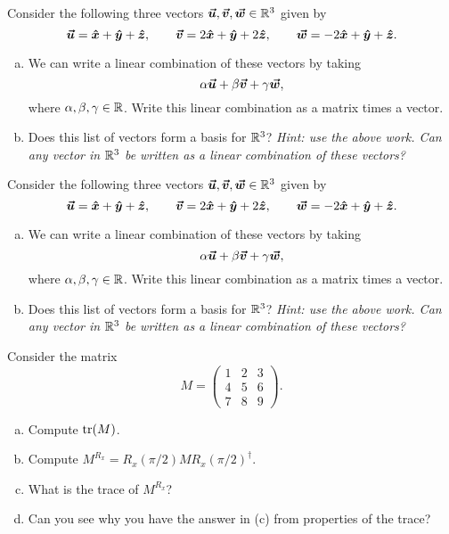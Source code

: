 \documentclass[12pt]{article} %
\begin{document}
\begin{problem}
Consider the following three vectors $\boldsymbol{\boldsymbol{\vec{u}}},\boldsymbol{\boldsymbol{\vec{v}}},\boldsymbol{\boldsymbol{\vec{w}}}\in \mathbb{R}^3$ given by
\[
\boldsymbol{\boldsymbol{\vec{u}}} = \boldsymbol{\hat{x}} + \boldsymbol{\hat{y}} +\boldsymbol{\hat{z}}, \qquad \boldsymbol{\boldsymbol{\vec{v}}} = 2\boldsymbol{\hat{x}} + \boldsymbol{\hat{y}} + 2\boldsymbol{\hat{z}}, \qquad \boldsymbol{\boldsymbol{\vec{w}}} = -2\boldsymbol{\hat{x}} + \boldsymbol{\hat{y}} +\boldsymbol{\hat{z}}. 
\]
\begin{enumerate}[(a)]
    \item We can write a linear combination of these vectors by taking
    \[
    \alpha \boldsymbol{\boldsymbol{\vec{u}}} + \beta \boldsymbol{\boldsymbol{\vec{v}}} + \gamma \boldsymbol{\boldsymbol{\vec{w}}},
    \]
    where $\alpha,\beta,\gamma \in \mathbb{R}$.  Write this linear combination as a matrix times a vector.
    \item Does this list of vectors form a basis for $\mathbb{R}^3$? \emph{Hint: use the above work. Can any vector in $\mathbb{R}^3$ be written as a linear combination of these vectors?}
\end{enumerate}
\end{problem}


\begin{problem}
Consider the following three vectors $\boldsymbol{\boldsymbol{\vec{u}}},\boldsymbol{\boldsymbol{\vec{v}}},\boldsymbol{\boldsymbol{\vec{w}}}\in \mathbb{R}^3$ given by
\[
\boldsymbol{\boldsymbol{\vec{u}}} = \boldsymbol{\hat{x}} + \boldsymbol{\hat{y}} +\boldsymbol{\hat{z}}, \qquad \boldsymbol{\boldsymbol{\vec{v}}} = 2\boldsymbol{\hat{x}} + \boldsymbol{\hat{y}} + 2\boldsymbol{\hat{z}}, \qquad \boldsymbol{\boldsymbol{\vec{w}}} = -2\boldsymbol{\hat{x}} + \boldsymbol{\hat{y}} +\boldsymbol{\hat{z}}. 
\]
\begin{enumerate}[(a)]
    \item We can write a linear combination of these vectors by taking
    \[
    \alpha \boldsymbol{\boldsymbol{\vec{u}}} + \beta \boldsymbol{\boldsymbol{\vec{v}}} + \gamma \boldsymbol{\boldsymbol{\vec{w}}},
    \]
    where $\alpha,\beta,\gamma \in \mathbb{R}$.  Write this linear combination as a matrix times a vector.
    \item Does this list of vectors form a basis for $\mathbb{R}^3$? \emph{Hint: use the above work. Can any vector in $\mathbb{R}^3$ be written as a linear combination of these vectors?}
\end{enumerate}
\end{problem}

\begin{problem}
Consider the matrix 
\[
M = \begin{pmatrix} 1 & 2 & 3 \\ 4 & 5 & 6 \\ 7 & 8 & 9 \end{pmatrix}.
\]
\begin{enumerate}[(a)]
    \item Compute $\mathrm{tr}(M)$. 
    \item Compute $M^{R_x}=R_x(\pi/2)MR_x(\pi/2)^\dagger$.
    \item What is the trace of $M^{R_x}$?
    \item Can you see why you have the answer in (c) from properties of the trace?
\end{enumerate}
\end{problem}
\end{document}
